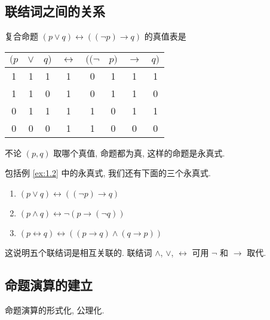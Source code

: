 \documentclass[
    color=black,
    device=normal,
    lang=cn
]{elegantnote}
\begin{document}
\subsection{联结词之间的关系}
\begin{example}\label{ex:1.2}
    复合命题 $(p \lor q)\leftrightarrow ((\lnot p)\to q)$ 的真值表是
    \begin{table}[!htbp]
        \centering
        \begin{tabular}{ccc|c|cccc}
            $(p$ & $\lor$ & $q)$ & $\leftrightarrow$ & $((\lnot$ & $p)$ & $\to$ & $q)$ \\
            \hline
            1    & 1      & 1    & 1                 & 0         & 1    & 1     & 1    \\
            1    & 1      & 0    & 1                 & 0         & 1    & 1     & 0    \\
            0    & 1      & 1    & 1                 & 1         & 0    & 1     & 1    \\
            0    & 0      & 0    & 1                 & 1         & 0    & 0     & 0
        \end{tabular}
    \end{table}
    不论 $(p, q)$ 取哪个真值, 命题都为真, 这样的命题是永真式.
\end{example}
包括例 \ref{ex:1.2} 中的永真式, 我们还有下面的三个永真式.
\begin{enumerate}[topsep = -1em]
    \item $(p \lor q)\leftrightarrow ((\lnot p)\to q)$
    \item $(p \land q)\leftrightarrow \lnot(p\to (\lnot q))$
    \item $(p\leftrightarrow q)\leftrightarrow ((p\to q)\land (q\to p))$
\end{enumerate}
这说明五个联结词是相互关联的. 联结词 $\land$, $\lor$, $\leftrightarrow$ 可用 $\lnot$ 和 $\to$ 取代.

\subsection{命题演算的建立}
命题演算的形式化, 公理化.
\end{document}
